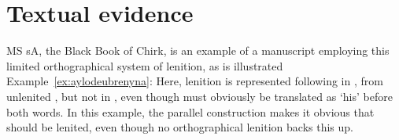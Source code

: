 \section{Textual evidence}
\label{sec:two-exampl-mowm}
MS \gls{sA}, the Black Book of Chirk,  is an example of a manuscript employing this limited orthographical system of lenition, as is illustrated Example~\ref{ex:aylodeubrenyna}: 
Here, lenition is represented following   in , from unlenited , but not in , even though  must obviously be translated as `his' before both words. In this example, the parallel construction makes it obvious that  should be lenited, even though  no orthographical lenition backs this up.

